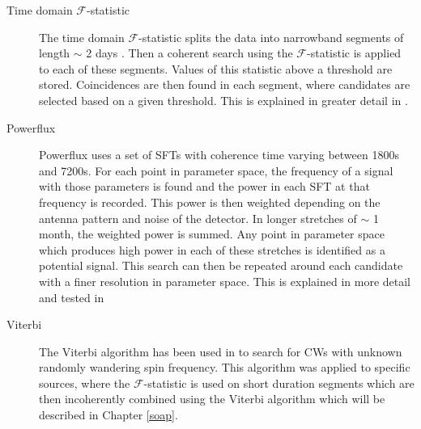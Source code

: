 \begin{description}
        \item[Time domain $\mathcal{F}$-statistic] The time domain
$\mathcal{F}$-statistic splits the data into narrowband segments of length
$\sim$ 2 days \citep{walsh2016ComparisonMethods}. Then a coherent search using
the $\mathcal{F}$-statistic is applied to each of these segments. Values of
this statistic above a threshold are stored. Coincidences are then found in
each segment, where candidates are selected based on a given
threshold. This is explained in greater detail in
\citep{aasi2014ImplementationTextdollar,walsh2016ComparisonMethods}.
	
        \item[Powerflux] Powerflux uses a set of \glspl{SFT} with coherence time varying between 1800s and 7200s.
For each point in parameter space, the frequency of a signal with those parameters is found and the power in each \gls{SFT} at that frequency is recorded. This power is then weighted depending on the antenna pattern and
noise of the detector. In longer stretches of $\sim$ 1 month, the weighted
power is summed. Any point in parameter space which produces high power in each
of these stretches is identified as a potential signal. This search can then be
repeated around each candidate with a finer resolution in parameter space. This
is explained in more detail and tested in
\citep{abadie2012AllskySearch,walsh2016ComparisonMethods,ligoscientificcollaborationandvirgocollaboration2016ComprehensiveAllsky}
	
        \item[Viterbi] The Viterbi algorithm \citep{viterbi1967ErrorBounds} has
been used in \citep{sun2018HiddenMarkov,
suvorova2017HiddenMarkov,abbott2017SearchGravitational,
abbott2018SearchGravitational, sun2018ApplicationHidden} to search for
\glspl{CW} with unknown randomly wandering spin frequency. This
algorithm was applied to specific sources, where the $\mathcal{F}$-statistic is
used on short duration segments which are then incoherently combined using the
Viterbi algorithm which will be described in Chapter \ref{soap}.
	
\end{description}

